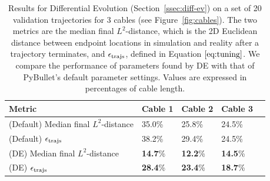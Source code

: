 \documentclass[letterpaper, 10 pt, conference]{ieeeconf}  %
\begin{document}
\begin{table}[t]
  \setlength\tabcolsep{5.0pt}
  \centering
  \caption{
    Results for Differential Evolution (Section~\ref{ssec:diff-ev}) on a set of 20 validation trajectories for 3 cables (see Figure~\ref{fig:cables}). The two metrics are the median final $L^2$-distance, which is the 2D Euclidean distance between endpoint locations in simulation and reality after a trajectory terminates, and $\epsilon_{\rm trajs}$, defined in Equation $\ref{eq:tuning}$. We compare the performance of parameters found by DE with that of PyBullet's default parameter settings. Values are expressed in percentages of cable length.
  }
  \small
  \begin{tabular}{@{}lllll}
  \toprule
  Metric & Cable 1  & Cable 2  & Cable 3  \\
  \midrule
  (Default) Median final $L^2$-distance & 35.0\% & 25.8\% & 24.5\% \\
  (Default) $\epsilon_{\rm trajs}$ & 38.2\% & 29.4\% & 24.5\% \\
  (DE) Median final $L^2$-distance & \textbf{14.7}\%  & \textbf{12.2}\% & \textbf{14.5}\% \\
  (DE) $\epsilon_{\rm trajs}$ & \textbf{28.4}\% & \textbf{23.4}\% & \textbf{18.7}\% \\
  \toprule
  \end{tabular}
  \vspace*{-10pt}
  \label{tab:tuning}
\end{table}  

\end{document}

